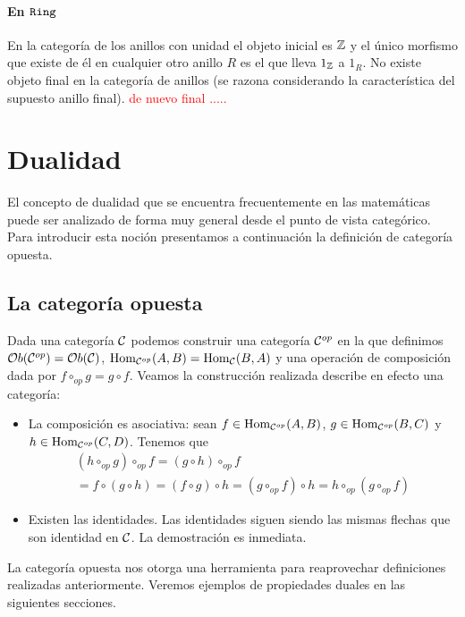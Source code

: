 \paragraph{En $\texttt{Ring}$}
En la categoría de los anillos con unidad el objeto inicial es
$\mathbb{Z}$ y el único morfismo que existe de él en cualquier otro anillo
$R$ es el que lleva $1_{\mathbb{Z}}$ a $1_R$. No existe objeto final en la
categoría de anillos (se razona considerando la característica
del supuesto anillo final). \textcolor{red}{de nuevo final .....}

\section{Dualidad}
El concepto de dualidad que se encuentra frecuentemente en las
matemáticas puede ser analizado de forma muy general desde el punto
de vista categórico. Para introducir esta noción presentamos a
continuación la definición de categoría opuesta.

\subsection{La categoría opuesta}
Dada una categoría $\mathcal{C}$ podemos construir una categoría
$\mathcal{C}^{op}$ en la que definimos $\mathcal{O}b(\mathcal{C}^{op}) = \mathcal{O}b(\mathcal{C})$,
$\operatorname{Hom}_{\mathcal{C}^{op}}(A, B) = \operatorname{Hom}_{\mathcal{C}}(B, A)$ y una operación de
composición dada por $f \circ_{op} g = g \circ f$. Veamos
la construcción realizada describe en efecto una categoría:
\begin{itemize}
\item La composición es asociativa: sean
      $f \in \operatorname{Hom}_{\mathcal{C}^{op}}(A, B)$, $g \in \operatorname{Hom}_{\mathcal{C}^{op}}(B, C)$
      y $h \in \operatorname{Hom}_{\mathcal{C}^{op}}(C, D)$. Tenemos que
\begin{multline*}
(h \circ_{op} g) \circ_{op} f = (g \circ h) \circ_{op} f \\
                              = f \circ (g \circ h)
                              = (f \circ g) \circ h
                              = (g \circ_{op} f)  \circ h
                              = h \circ_{op} (g \circ_{op} f)
\end{multline*}
\item Existen las identidades. Las identidades siguen siendo
      las mismas flechas que son identidad en $\mathcal{C}$. La demostración
      es inmediata.
\end{itemize}

La categoría opuesta nos otorga una herramienta para reaprovechar
definiciones realizadas anteriormente. Veremos ejemplos de propiedades
duales en las siguientes secciones.

